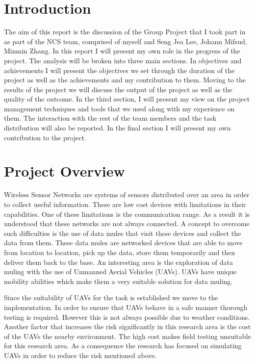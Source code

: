 





\tableofcontents{}

\pagebreak

\section{Introduction}
The aim of this report is the discussion of the Group Project that I took part
in as part of the NCS team, comprised of myself and Seng Jea Lee, Johann Mifsud,
Minmin Zhang. In this report I will present my own role in the progress of
the project. The analysis will be broken into three main sections. In objectives
and achievements I will present the objectives we set through the duration of
the project as well as the achievements and my contribution to them. Moving to
the results of the project we will discuss the output of the project as well as
the quality of the outcome. In the third section, I will present my view on the
project management techniques and tools that we used along with my experience on
them. The interaction with the rest of the team members and the task
distribution will also be reported. In the final section I will present my own
contribution to the project.

\section{Project Overview}
Wireless Sensor Networks are systems of sensors distributed over an area in
order to collect useful information. These are low cost devices with limitations
in their capabilities. One of these limitations is the communication range. As a
result it is understood that these networks are not always connected. A concept
to overcome such difficulties is the use of data mules that visit these devices
and collect the data from them. These data mules are networked devices that are
able to move from location to location, pick up the data, store them
temporarily and then deliver them back to the base. An interesting area is the
exploration of data muling with the use of Unmanned Aerial Vehicles (UAVs).
UAVs have unique mobility abilities which make them a very suitable solution
for data muling.

Since the suitability of UAVs for the task is established we move to the
implementation. In order to ensure that UAVs behave in a safe manner thorough
testing is required. However this is not always possible due to weather
conditions. Another factor that increases the risk significantly in this
research area is the cost of the UAVs the nearby environment. The high cost
makes field testing unsuitable for this research area. As a consequence the
research has focused on simulating UAVs in order to reduce the risk mentioned
above.

